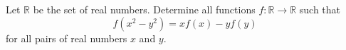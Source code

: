 Let $\mathbb{R}$ be the set of real numbers. Determine all functions $f: \mathbb{R} \to \mathbb{R}$ such that \[ f(x^2 - y^2) = x f(x) - y f(y)  \] for all pairs of real numbers $x$ and $y$.